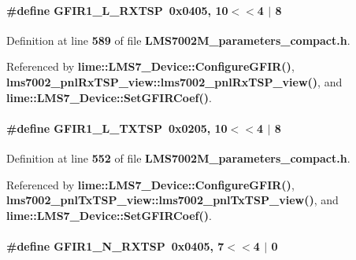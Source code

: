 \paragraph[{G\+F\+I\+R1\+\_\+\+L\+\_\+\+R\+X\+T\+SP}]{\setlength{\rightskip}{0pt plus 5cm}\#define G\+F\+I\+R1\+\_\+\+L\+\_\+\+R\+X\+T\+SP~0x0405, 10$<$$<$4 $\vert$  8}\label{LMS7002M__parameters__compact_8h_a8f8a10b9b87ac1513ea50b7f1817b1c4}


Definition at line {\bf 589} of file {\bf L\+M\+S7002\+M\+\_\+parameters\+\_\+compact.\+h}.



Referenced by {\bf lime\+::\+L\+M\+S7\+\_\+\+Device\+::\+Configure\+G\+F\+I\+R()}, {\bf lms7002\+\_\+pnl\+Rx\+T\+S\+P\+\_\+view\+::lms7002\+\_\+pnl\+Rx\+T\+S\+P\+\_\+view()}, and {\bf lime\+::\+L\+M\+S7\+\_\+\+Device\+::\+Set\+G\+F\+I\+R\+Coef()}.

\paragraph[{G\+F\+I\+R1\+\_\+\+L\+\_\+\+T\+X\+T\+SP}]{\setlength{\rightskip}{0pt plus 5cm}\#define G\+F\+I\+R1\+\_\+\+L\+\_\+\+T\+X\+T\+SP~0x0205, 10$<$$<$4 $\vert$  8}\label{LMS7002M__parameters__compact_8h_a688cea098543c1193325aa092881fa17}


Definition at line {\bf 552} of file {\bf L\+M\+S7002\+M\+\_\+parameters\+\_\+compact.\+h}.



Referenced by {\bf lime\+::\+L\+M\+S7\+\_\+\+Device\+::\+Configure\+G\+F\+I\+R()}, {\bf lms7002\+\_\+pnl\+Tx\+T\+S\+P\+\_\+view\+::lms7002\+\_\+pnl\+Tx\+T\+S\+P\+\_\+view()}, and {\bf lime\+::\+L\+M\+S7\+\_\+\+Device\+::\+Set\+G\+F\+I\+R\+Coef()}.

\paragraph[{G\+F\+I\+R1\+\_\+\+N\+\_\+\+R\+X\+T\+SP}]{\setlength{\rightskip}{0pt plus 5cm}\#define G\+F\+I\+R1\+\_\+\+N\+\_\+\+R\+X\+T\+SP~0x0405, 7$<$$<$4 $\vert$  0}\label{LMS7002M__parameters__compact_8h_a06d281e15fc1b4c4b5d6427d2b116804}



